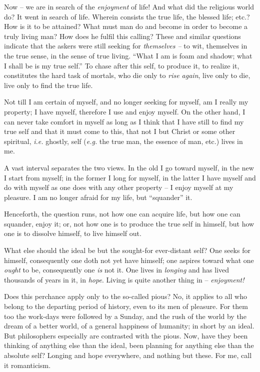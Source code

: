 Now -- we are in search of the \textit{enjoyment} of life! And what did the 
religious world do? It went in search of life. Wherein consists the true life, 
the blessed life; etc.? How is it to be attained? What must man do and become 
in order to become a truly living man? How does he fulfil this calling? These 
and similar questions indicate that the askers were still seeking for 
\textit{themselves --} to wit, themselves in the true sense, in the sense of 
true living. ``What I am is foam and shadow; what I shall be is my true 
self.'' To chase after this self, to produce it, to realize it, constitutes 
the hard task of mortals, who die only to \textit{rise again}, live only to 
die, live only to find the true life.

Not till I am certain of myself, and no longer seeking for myself, am I really 
my property; I have myself, therefore I use and enjoy myself. On the other 
hand, I can never take comfort in myself as long as I think that I have still 
to find my true self and that it must come to this, that not I but Christ or 
some other spiritual, \textit{i.e.} ghostly, self (\textit{e.g.} the true 
man, the essence of man, etc.) lives in me.

A vast interval separates the two views. In the old I go toward myself, in the 
new I start from myself; in the former I long for myself, in the latter I have 
myself and do with myself as one does with any other property -- I enjoy 
myself at my pleasure. I am no longer afraid for my life, but ``squander'' 
it.

Henceforth, the question runs, not how one can acquire life, but how one can 
squander, enjoy it; or, not how one is to produce the true self in himself, 
but how one is to dissolve himself, to live himself out.

What else should the ideal be but the sought-for ever-distant self? One seeks 
for himself, consequently one doth not yet have himself; one aspires toward 
what one \textit{ought} to be, consequently one \textit{is} not it. One lives 
in \textit{longing} and has lived thousands of years in it, in \textit{hope}. 
Living is quite another thing in -- \textit{enjoyment!}

Does this perchance apply only to the so-called pious? No, it applies to all 
who belong to the departing period of history, even to its men of pleasure. 
For them too the work-days were followed by a Sunday, and the rush of the 
world by the dream of a better world, of a general happiness of humanity; in 
short by an ideal. But philosophers especially are contrasted with the pious. 
Now, have they been thinking of anything else than the ideal, been planning 
for anything else than the absolute self? Longing and hope everywhere, and 
nothing but these. For me, call it romanticism.

